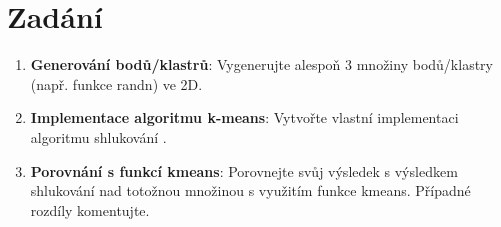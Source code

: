 \section{Zadání}

\begin{enumerate}
    \item \textbf{Generování bodů/klastrů}: Vygenerujte alespoň 3 množiny bodů/klastry (např. funkce randn) ve 2D.
    \item \textbf{Implementace algoritmu k-means}: Vytvořte vlastní implementaci algoritmu shlukování .
    \item \textbf{Porovnání s funkcí kmeans}: Porovnejte svůj výsledek s výsledkem shlukování nad totožnou množinou s využitím funkce kmeans. Případné rozdíly komentujte.
\end{enumerate}
